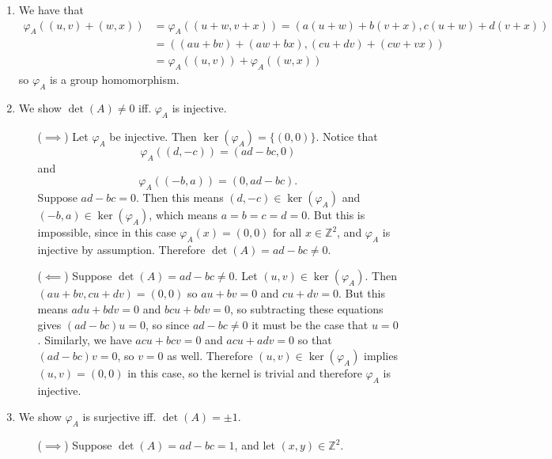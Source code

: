 \documentclass{article}
\begin{document}
\begin{Answer}
\begin{enumerate}
  \item{
    We have that
    \begin{align*}
    \varphi_A((u, v) + (w, x)) &=
      \varphi_A((u + w, v + x)) =
      (a(u + w) + b(v + x), c(u + w) + d(v + x)) \\
      &= ((au + bv) + (aw + bx), (cu + dv) + (cw + vx)) \\
      &= \varphi_A((u, v)) + \varphi_A((w, x))
    \end{align*}
    so $\varphi_A$ is a group homomorphism.
  }
  \item{
    We show $\det(A) \neq 0$ iff. $\varphi_A$ is injective.
    \begin{itemize}
      \item[($\implies$)]
      {
        Let $\varphi_A$ be injective. Then
        $\ker(\varphi_A) = \{(0, 0)\}$. Notice that
        $$
        \varphi_A((d, -c)) = (ad - bc, 0)
        $$
        and
        $$
        \varphi_A((-b, a)) = (0, ad - bc).
        $$
        Suppose $ad - bc = 0$. Then this means
        $(d, -c) \in \ker(\varphi_A)$ and $(-b, a) \in \ker(\varphi_A)$,
        which means $a = b = c = d = 0$. But this is impossible, since in
        this case $\varphi_A(x) = (0, 0)$ for all $x \in \mathbb{Z}^2$,
        and $\varphi_A$ is injective by assumption. Therefore
        $\det(A) = ad - bc \neq 0$.
      }
      \item[($\impliedby$)]
      {
        Suppose $\det(A) = ad - bc \neq 0$. Let $(u, v) \in
        \ker(\varphi_A)$. Then $(au + bv, cu + dv) = (0, 0)$
        so $au + bv = 0$ and $cu + dv = 0$. But this means
        $adu + bdv = 0$ and $bcu + bdv = 0$, so subtracting these
        equations gives $(ad - bc)u = 0$, so since $ad - bc \neq 0$ it
        must be the case that $u = 0$. Similarly, we have
        $acu + bcv = 0$ and $acu + adv = 0$ so that $(ad - bc)v = 0$, so
        $v = 0$ as well. Therefore $(u, v) \in \ker(\varphi_A)$ implies
        $(u, v) = (0, 0)$ in this case, so the kernel is trivial and
        therefore $\varphi_A$ is injective.
      }
    \end{itemize}
  }
  \item
  {
    We show $\varphi_A$ is surjective iff. $\det(A) = \pm 1$.
    \begin{itemize}
      \item[($\implies$)]
      {
        Suppose $\det(A) = ad - bc = 1$, and let $(x, y) \in
        \mathbb{Z}^2$.
}
\end{itemize}}
\end{enumerate}
\end{Answer}
\end{document}

